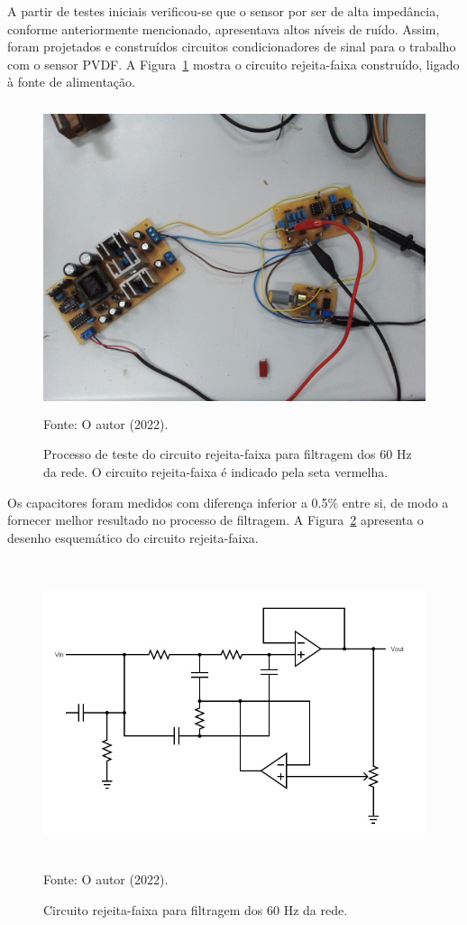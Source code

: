 \documentclass[
	12pt,				
	oneside,			
	a4paper,			
	english,			
	brazil,			
	]{abntex2ppgsi}
\begin{document}
A partir de testes iniciais verificou-se que o sensor por ser de alta impedância, conforme anteriormente mencionado, apresentava altos níveis de ruído. Assim, foram projetados e construídos circuitos condicionadores de sinal para o trabalho com o sensor PVDF. A Figura~\ref{circuito_rejeita_faixa} mostra o circuito rejeita-faixa construído, ligado à fonte de alimentação. 

\begin{figure}[H]
\centering
\caption {Processo de teste do circuito rejeita-faixa para filtragem dos 60 Hz da rede. O circuito rejeita-faixa é indicado pela seta vermelha.}
\includegraphics[width=\textwidth,height=90mm,keepaspectratio]{circuito_rejeita_faixa} \\
Fonte: O autor (2022).
\label{circuito_rejeita_faixa}
\end{figure} 

Os capacitores foram medidos com diferença inferior a 0.5\% entre si, de modo a fornecer melhor resultado no processo de filtragem. A Figura~\ref{circuito_notch} apresenta o desenho esquemático do circuito rejeita-faixa.

\begin{figure}[H]
\centering
\caption {Circuito rejeita-faixa para filtragem dos 60 Hz da rede.}
\includegraphics[width=\textwidth,height=90mm,keepaspectratio]{circuito_notch} \\
Fonte: O autor (2022).
\label{circuito_notch}
\end{figure} 
\end{document}

